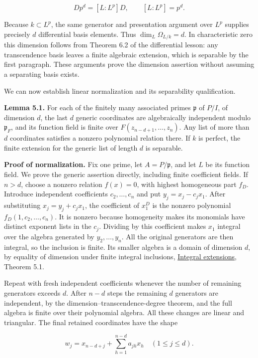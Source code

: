 \documentclass[
]{article}
\begin{document}
\[
D p^d=[L:L^p]D,\qquad [L:L^p]=p^d.
\]

Because \(k\subset L^p\), the same generator and presentation argument
over \(L^p\) supplies precisely \(d\) differential basis elements. Thus
\(\dim_L\Omega_{L/k}=d\). In characteristic zero this dimension follows
from Theorem 6.2 of the differential lesson: any transcendence basis
leaves a finite algebraic extension, which is separable by the first
paragraph. These arguments prove the dimension assertion without
assuming a separating basis exists.

We can now establish linear normalization and its separability
qualification.

\textbf{Lemma 5.1.} For each of the finitely many associated primes
\(\mathfrak p\) of \(P/I\), of dimension \(d\), the last \(d\) generic
coordinates are algebraically independent modulo \(\mathfrak p_F\), and
its function field is finite over \(F(z_{n-d+1},\ldots,z_n)\). Any list
of more than \(d\) coordinates satisfies a nonzero polynomial relation
there. If \(k\) is perfect, the finite extension for the generic list of
length \(d\) is separable.

\textbf{Proof of normalization.} Fix one prime, let \(A=P/\mathfrak p\),
and let \(L\) be its function field. We prove the generic assertion
directly, including finite coefficient fields. If \(n>d\), choose a
nonzero relation \(f(x)=0\), with highest homogeneous part \(f_D\).
Introduce independent coefficients \(c_2,\ldots,c_n\) and put
\(y_j=x_j-c_jx_1\). After substituting \(x_j=y_j+c_jx_1\), the
coefficient of \(x_1^D\) is the nonzero polynomial
\(f_D(1,c_2,\ldots,c_n)\). It is nonzero because homogeneity makes its
monomials have distinct exponent lists in the \(c_j\). Dividing by this
coefficient makes \(x_1\) integral over the algebra generated by
\(y_2,\ldots,y_n\). All the original generators are then integral, so
the inclusion is finite. Its smaller algebra is a domain of dimension
\(d\), by equality of dimension under finite integral inclusions,
\href{../prerequisites/AG-CA/AG-CA-05.html}{Integral extensions},
Theorem 5.1.

Repeat with fresh independent coefficients whenever the number of
remaining generators exceeds \(d\). After \(n-d\) steps the remaining
\(d\) generators are independent, by the dimension--transcendence-degree
theorem, and the full algebra is finite over their polynomial algebra.
All these changes are linear and triangular. The final retained
coordinates have the shape

\[
w_j=x_{n-d+j}+\sum_{h=1}^{n-d}a_{jh}x_h\quad(1\le j\le d).
\]
\end{document}
